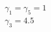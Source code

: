 \documentclass[preview]{standalone}
\begin{document}
\begin{center}
$\gamma_1 = \gamma_5 = 1$\\$\gamma_3 = 4.5$
\end{center}
\end{document}
